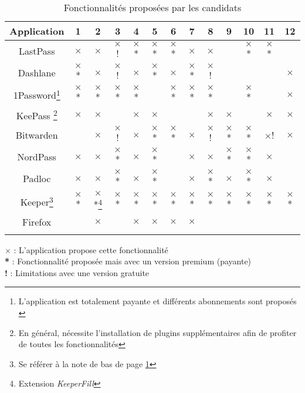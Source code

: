 \begin{longtable}[h]{|c|c|c|c|c|c|c|c|c|c|c|c|c|}
	\hline
	Application & 1 & 2 & 3 & 4 & 5 & 6 & 7 & 8 & 9 & 10 & 11 & 12 \\
	\hline
	LastPass & $\times$ & $\times$ & $\times$! & $\times$* & $\times$* &  $\times$*& $\times$ & $\times$ & & $\times$* & $\times$* &  \\
		\hline
	Dashlane & $\times$* & $\times$ & $\times$! & $\times$ & $\times$* & $\times$ & $\times$* & $\times$! & & &  & $\times$ \\
		\hline
	1Password\footnote{L'application est totalement payante et différents abonnements sont proposés \label{1p}} & $\times$* & $\times$* & $\times$* & $\times$* & & $\times$* & $\times$* & $\times$* & & $\times$* & & $\times$ \\
			\hline
	KeePass \footnote{En général, nécessite l'installation de plugins supplémentaires afin de profiter de toutes les fonctionnalités} & $\times$ & $\times$ &  & $\times$ & $\times$ & & & $\times$ & $\times$ & & $\times$ & $\times$ \\
		\hline
	Bitwarden &  & $\times$  & $\times$! & $\times$ & $\times$* & $\times$* & $\times$ & $\times$! & $\times$* &  $\times$* & $\times$! & $\times$\\
	\hline
	NordPass & $\times$ & $\times$ & $\times$*  & $\times$ & $\times$* & & $\times$ & $\times$ & $\times$* & $\times$* & $\times$ & \\
	\hline
	Padloc & $\times$ & $\times$ & $\times$* & $\times$ & $\times$* & & $\times$ & $\times$* & $\times$ & $\times$* & $\times$ & \\
	\hline
	Keeper\footnote{Se référer à la note de bas de page \ref{1p}} & $\times$* & $\times$*\footnote{Extension \textit{KeeperFill}} & $\times$* & $\times$* &$\times$* & $\times$* & $\times$* &$\times$* &$\times$* & $\times$* & $\times$* & $\times$* \\
	\hline
	Firefox &  & $\times$  &  & $\times$  & $\times$ & $\times$ & $\times$ &  &  &  &  & \\
	\hline
	\caption{Fonctionnalités proposées par les candidats}
\end{longtable} 
$\times$ : L'application propose cette fonctionnalité \\
\textbf{*}\hspace{0.1cm} : Fonctionnalité proposée mais avec un version premium (payante) \\
\textbf{!}\hspace{0.18cm} : Limitations avec une version gratuite \\

